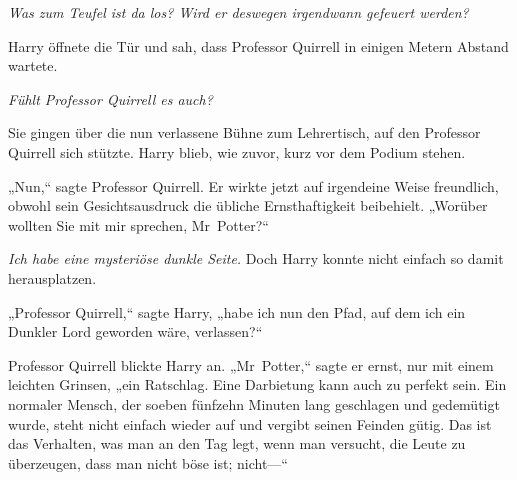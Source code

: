 \emph{Was zum Teufel ist da los? Wird er deswegen irgendwann gefeuert werden?}

Harry öffnete die Tür und sah, dass Professor Quirrell in einigen Metern Abstand wartete.

\emph{Fühlt Professor Quirrell es auch?}

Sie gingen über die nun verlassene Bühne zum Lehrertisch, auf den Professor Quirrell sich stützte. Harry blieb, wie zuvor, kurz vor dem Podium stehen.

„Nun,“ sagte Professor Quirrell. Er wirkte jetzt auf irgendeine Weise freundlich, obwohl sein Gesichtsausdruck die übliche Ernsthaftigkeit beibehielt. „Worüber wollten Sie mit mir sprechen, Mr~Potter?“

\emph{Ich habe eine mysteriöse dunkle Seite.} Doch Harry konnte nicht einfach so damit herausplatzen.

„Professor Quirrell,“ sagte Harry, „habe ich nun den Pfad, auf dem ich ein Dunkler Lord geworden wäre, verlassen?“

Professor Quirrell blickte Harry an. „Mr~Potter,“ sagte er ernst, nur mit einem leichten Grinsen, „ein Ratschlag. Eine Darbietung kann auch zu perfekt sein. Ein normaler Mensch, der soeben fünfzehn Minuten lang geschlagen und gedemütigt wurde, steht nicht einfach wieder auf und vergibt seinen Feinden gütig. Das ist das Verhalten, was man an den Tag legt, wenn man versucht, die Leute zu überzeugen, dass man nicht böse ist; nicht—“

